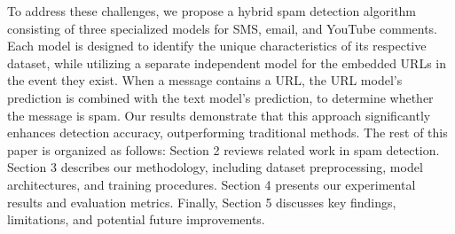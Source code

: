 \documentclass{article}
\begin{document}
\newline
\newline
To address these challenges, we propose a hybrid spam detection algorithm consisting of three specialized models for SMS, email, and YouTube comments. Each model is designed to identify the unique characteristics of its respective dataset, while utilizing a separate independent model for the embedded URLs in the event they exist. When a message contains a URL, the URL model’s prediction is combined with the text model’s prediction, to determine whether the message is spam. Our results demonstrate that this approach significantly enhances detection accuracy, outperforming traditional methods.
\newline
\newline
The rest of this paper is organized as follows: Section 2 reviews related work in spam detection. Section 3 describes our methodology, including dataset preprocessing, model architectures, and training procedures. Section 4 presents our experimental results and evaluation metrics. Finally, Section 5 discusses key findings, limitations, and potential future improvements.


\end{document}
